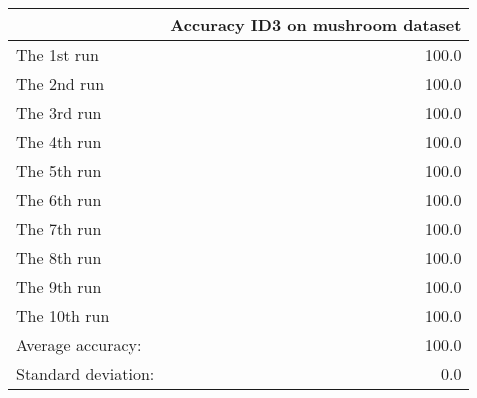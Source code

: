 \begin{tabular}{lr}
\toprule
{} &  Accuracy ID3 on mushroom dataset \\
\midrule
The 1st run         &                             100.0 \\
The 2nd run         &                             100.0 \\
The 3rd run         &                             100.0 \\
The 4th run         &                             100.0 \\
The 5th run         &                             100.0 \\
The 6th run         &                             100.0 \\
The 7th run         &                             100.0 \\
The 8th run         &                             100.0 \\
The 9th run         &                             100.0 \\
The 10th run        &                             100.0 \\
Average accuracy:   &                             100.0 \\
Standard deviation: &                               0.0 \\
\bottomrule
\end{tabular}
